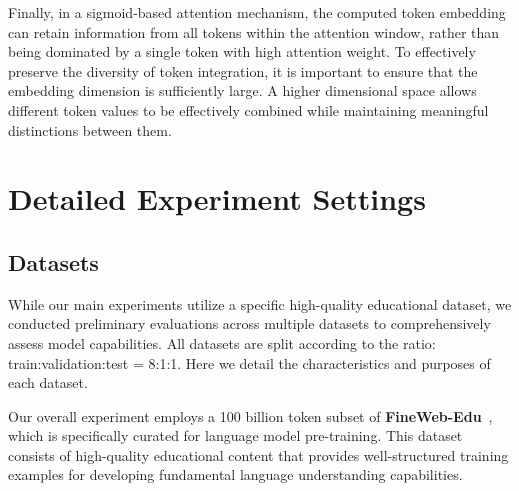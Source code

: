 Finally, in a sigmoid-based attention mechanism, the computed token embedding can retain information from all tokens within the attention window, rather than being dominated by a single token with high attention weight. To effectively preserve the diversity of token integration, it is important to ensure that the embedding dimension is sufficiently large. A higher dimensional space allows different token values to be effectively combined while maintaining meaningful distinctions between them.


\section{Detailed Experiment Settings}
\label{app:experiment-settings}

\subsection{Datasets}
While our main experiments utilize a specific high-quality educational dataset, we conducted preliminary evaluations across multiple datasets to comprehensively assess model capabilities. All datasets are split according to the ratio: train:validation:test = 8:1:1. Here we detail the characteristics and purposes of each dataset. 

Our overall experiment employs a 100 billion token subset of \textbf{FineWeb-Edu}~\cite{fineweb-edu}, which is specifically curated for language model pre-training. This dataset consists of high-quality educational content that provides well-structured training examples for developing fundamental language understanding capabilities.

\begin{table}[t]
\centering
\caption{Statistics of the datasets used in our analysis experiments. All datasets are in English and split into train, validation, and test sets with a ratio of 8:1:1. Sample sizes are reported in millions (M) or thousands (K).}
\label{tab:dataset}
\end{table}


